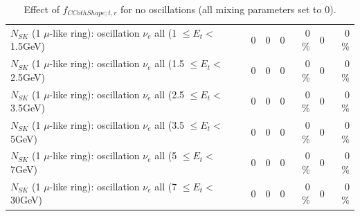 \begin{table}
\begin{tabular}{| l | r | r | r  r | r  r |}
$N_{SK}$ (1 $\mu$-like ring): oscillation $\nu_{e}$ all (1 $\leq E_{t} <$ 1.5GeV) &               0 &               0 &               0 &        0 \%  &               0 &        0 \%  \\ 
$N_{SK}$ (1 $\mu$-like ring): oscillation $\nu_{e}$ all (1.5 $\leq E_{t} <$ 2.5GeV) &               0 &               0 &               0 &        0 \%  &               0 &        0 \%  \\ 
$N_{SK}$ (1 $\mu$-like ring): oscillation $\nu_{e}$ all (2.5 $\leq E_{t} <$ 3.5GeV) &               0 &               0 &               0 &        0 \%  &               0 &        0 \%  \\ 
$N_{SK}$ (1 $\mu$-like ring): oscillation $\nu_{e}$ all (3.5 $\leq E_{t} <$ 5GeV) &               0 &               0 &               0 &        0 \%  &               0 &        0 \%  \\ 
 $N_{SK}$ (1 $\mu$-like ring): oscillation $\nu_{e}$ all (5 $\leq E_{t} <$ 7GeV) &               0 &               0 &               0 &        0 \%  &               0 &        0 \%  \\ 
$N_{SK}$ (1 $\mu$-like ring): oscillation $\nu_{e}$ all (7 $\leq E_{t} <$ 30GeV) &               0 &               0 &               0 &        0 \%  &               0 &        0 \%  \\ 
\hline
\hline
\end{tabular}
\caption{ Effect of $f_{CCothShape; t, r}$ for no oscillations (all mixing parameters set to 0). }
\label{tab:num_xsec_shape_ccoth_1RmuT_3f_osc_t13:0}
\end{table}
\clearpage
